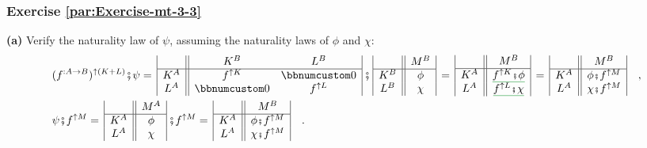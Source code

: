 \subsubsection*{Exercise \ref{par:Exercise-mt-3-3}}

\textbf{(a)} Verify the naturality law of $\psi$, assuming the naturality
laws of $\phi$ and $\chi$:
\begin{align*}
 & (f^{:A\rightarrow B})^{\uparrow(K+L)}\bef\psi=\,\begin{array}{|c||cc|}
 & K^{B} & L^{B}\\
\hline K^{A} & f^{\uparrow K} & \bbnum 0\\
L^{A} & \bbnum 0 & f^{\uparrow L}
\end{array}\,\bef\,\begin{array}{|c||c|}
 & M^{B}\\
\hline K^{B} & \phi\\
L^{B} & \chi
\end{array}\,=\,\begin{array}{|c||c|}
 & M^{B}\\
\hline K^{A} & \gunderline{f^{\uparrow K}\bef\phi}\\
L^{A} & \gunderline{f^{\uparrow L}\bef\chi}
\end{array}\,=\,\begin{array}{|c||c|}
 & M^{B}\\
\hline K^{A} & \phi\bef f^{\uparrow M}\\
L^{A} & \chi\bef f^{\uparrow M}
\end{array}\quad,\\
 & \psi\bef f^{\uparrow M}=\,\begin{array}{|c||c|}
 & M^{A}\\
\hline K^{A} & \phi\\
L^{A} & \chi
\end{array}\,\bef f^{\uparrow M}=\,\begin{array}{|c||c|}
 & M^{B}\\
\hline K^{A} & \phi\bef f^{\uparrow M}\\
L^{A} & \chi\bef f^{\uparrow M}
\end{array}\quad.
\end{align*}

